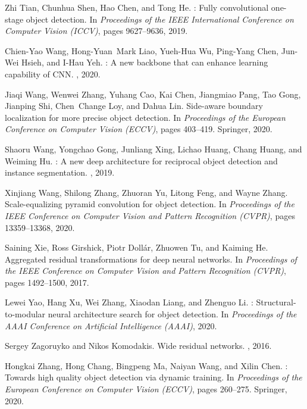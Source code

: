 \documentclass[10pt,twocolumn,letterpaper]{article}
\begin{document}
{\begin{thebibliography}{10}
	Zhi Tian, Chunhua Shen, Hao Chen, and Tong He.
	: Fully convolutional one-stage object detection.
	\newblock In {\em Proceedings of the IEEE International Conference on Computer
		Vision (ICCV)}, pages 9627--9636, 2019.
	
	Chien-Yao Wang, Hong-Yuan~Mark Liao, Yueh-Hua Wu, Ping-Yang Chen, Jun-Wei
	Hsieh, and I-Hau Yeh.
	: A new backbone that can enhance learning capability of
	{CNN}.
	, 2020.
	
	Jiaqi Wang, Wenwei Zhang, Yuhang Cao, Kai Chen, Jiangmiao Pang, Tao Gong,
	Jianping Shi, Chen~Change Loy, and Dahua Lin.
	\newblock Side-aware boundary localization for more precise object detection.
	\newblock In {\em Proceedings of the European Conference on Computer Vision
		(ECCV)}, pages 403--419. Springer, 2020.
	
	Shaoru Wang, Yongchao Gong, Junliang Xing, Lichao Huang, Chang Huang, and
	Weiming Hu.
	: A new deep architecture for reciprocal object detection and
	instance segmentation.
	, 2019.
	
	Xinjiang Wang, Shilong Zhang, Zhuoran Yu, Litong Feng, and Wayne Zhang.
	\newblock Scale-equalizing pyramid convolution for object detection.
	\newblock In {\em Proceedings of the IEEE Conference on Computer Vision and
		Pattern Recognition (CVPR)}, pages 13359--13368, 2020.
	
	Saining Xie, Ross Girshick, Piotr Doll{\'a}r, Zhuowen Tu, and Kaiming He.
	\newblock Aggregated residual transformations for deep neural networks.
	\newblock In {\em Proceedings of the IEEE Conference on Computer Vision and
		Pattern Recognition (CVPR)}, pages 1492--1500, 2017.
	
	Lewei Yao, Hang Xu, Wei Zhang, Xiaodan Liang, and Zhenguo Li.
	: Structural-to-modular neural architecture search for object
	detection.
	\newblock In {\em Proceedings of the AAAI Conference on Artificial Intelligence
		(AAAI)}, 2020.
	
	Sergey Zagoruyko and Nikos Komodakis.
	\newblock Wide residual networks.
	, 2016.
	
	Hongkai Zhang, Hong Chang, Bingpeng Ma, Naiyan Wang, and Xilin Chen.
	: Towards high quality object detection via dynamic
	training.
	\newblock In {\em Proceedings of the European Conference on Computer Vision
		(ECCV)}, pages 260--275. Springer, 2020.
	

\end{thebibliography}}
\end{document}
